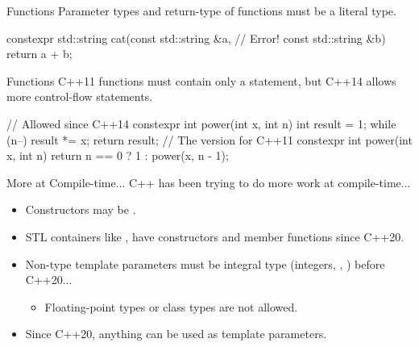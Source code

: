 \begin{frame}[fragile]{ Functions}
    Parameter types and return-type of \constexpr functions must be a literal type.
    \begin{cpp}
constexpr std::string cat(const std::string &a, // Error!
                          const std::string &b) {
  return a + b;
}
    \end{cpp}
\end{frame}

\begin{frame}[fragile]{ Functions}
    C++11 \constexpr functions must contain only a  statement, but C++14 allows more control-flow statements.
    \begin{cpp}
// Allowed since C++14
constexpr int power(int x, int n) {
  int result = 1;
  while (n--)
    result *= x;
  return result;
}
// The version for C++11
constexpr int power(int x, int n) {
  return n == 0 ? 1 : power(x, n - 1);
}
    \end{cpp}
\end{frame}

\begin{frame}[fragile]{More at Compile-time...}
    C++ has been trying to do more work at compile-time...
    \begin{itemize}
        \item Constructors may be \constexpr.
        \item STL containers like ,  have \constexpr constructors and member functions since C++20.
        \pause
        \item Non-type template parameters must be integral type (integers, , ) before C++20...
        \begin{itemize}
            \item Floating-point types or class types are not allowed.
        \end{itemize}
        \pause
        \item Since C++20, anything can be used as template parameters.
    \end{itemize}
\end{frame}